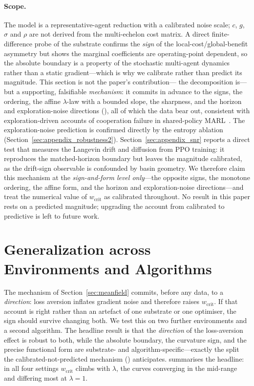 \documentclass[letterpaper]{article}
\theoremstyle{plain}
\newcommand{\wcrit}{w_{\mathrm{crit}}}
\begin{document}
\paragraph{Scope.} The model is a representative-agent reduction with a
calibrated noise scale; $c$, $g$, $\sigma$ and $\rho$ are not derived from
the multi-echelon cost matrix. A direct finite-difference probe of the
substrate confirms the \emph{sign} of the local-cost/global-benefit
asymmetry but shows the marginal coefficients are operating-point dependent,
so the absolute boundary is a property of the stochastic multi-agent
dynamics rather than a static gradient---which is why we calibrate rather
than predict its magnitude. This section is not the paper's contribution---
the decomposition is---but a supporting, falsifiable \emph{mechanism}: it
commits in advance to the signs, the ordering, the affine $\lambda$-law with
a bounded slope, the sharpness, and the horizon and exploration-noise
directions (), all of which the data bear out, consistent
with exploration-driven accounts of cooperation failure in shared-policy
MARL~\citep{weng2026}. The exploration-noise prediction is confirmed
directly by the entropy ablation (Section~\ref{sec:appendix_robustness2}).
Section~\ref{sec:appendix_snr} reports a direct test that
measures the Langevin drift and diffusion from PPO training: it reproduces
the matched-horizon boundary but leaves the magnitude calibrated, as the
drift-sign observable is confounded by basin geometry.
We therefore claim this mechanism at the \emph{sign-and-form level only}---the
opposite signs, the monotone ordering, the affine form, and the horizon and
exploration-noise directions---and treat the numerical value of $\wcrit$ as
calibrated throughout. No result in this paper rests on a predicted magnitude;
upgrading the account from calibrated to predictive is left to future work.

\section{Generalization across Environments and Algorithms}
\label{sec:generalization}

The mechanism of Section~\ref{sec:meanfield} commits, before any data, to a
\emph{direction}: loss aversion inflates gradient noise and therefore raises
$\wcrit$. If that account is right rather than an artefact of one substrate or
one optimiser, the sign should survive changing both. We test this on two
further environments and a second algorithm. The headline result is that the
\emph{direction} of the loss-aversion effect is robust to both, while the
absolute boundary, the curvature sign, and the precise functional form are
substrate- and algorithm-specific---exactly the split the calibrated-not-predicted
mechanism () anticipates.
 summarises the headline: in all four settings
$\wcrit$ climbs with $\lambda$, the curves converging in the mid-range and
differing most at $\lambda{=}1$.
\end{document}

